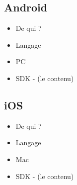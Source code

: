 \subsection{Android}
	\begin{itemize}
		\item{De qui ?}
		\item{Langage}
		\item{PC}
		\item{SDK - (le contenu)}
	\end{itemize}

\subsection{iOS}
	\begin{itemize}
		\item{De qui ?}
		\item{Langage}
		\item{Mac}
		\item{SDK - (le contenu)}
	\end{itemize}